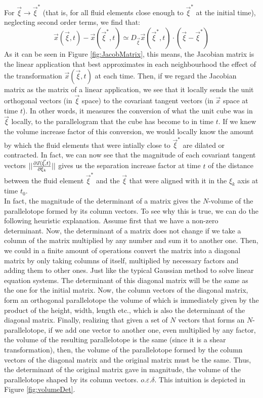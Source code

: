 \documentclass[11pt, a4paper]{article} %
\DeclareRobustCommand{\mybox}[2][gray!20]{%
\begin{tcolorbox}[   %
        left=1cm,
        right=1cm,
        top=0.5cm,
        bottom=0.5cm,
        colback=#1,
        colframe=#1,
        width=\dimexpr\textwidth\relax, 
        enlarge left by=0mm,
        boxsep=5pt,
        arc=0pt,outer arc=0pt,
        ]
        #2
\end{tcolorbox}
}
\begin{document}
\mybox{
For $\vec{\xi}\rightarrow \vec{\xi}^*$ (that is, for all fluid elements close enough to $\vec{\xi}^*$ at the initial time), neglecting second order terms, we find that:
\begin{equation}
\vec{x}(\vec{\xi},t)-\vec{x}(\vec{\xi}^*,t)\simeq D_{\vec{\xi}}\vec{x}(\vec{\xi}^*,t)\cdot (\vec{\xi}-\vec{\xi}^*)
\end{equation}
As it can be seen in Figure \ref{fig:JacobMatrix}, this means, the Jacobian matrix is the linear application that best approximates in each neighbourhood the effect of the transformation $\vec{x}(\vec{\xi},t)$ at each time. Then, if we regard the Jacobian matrix as the matrix of a linear application, we see that it locally sends the unit orthogonal vectors (in $\vec{\xi}$ space) to the covariant tangent vectors (in $\vec{x}$ space at time $t$). In other words, it measures the conversion of what the unit cube was in $\vec{\xi}$ locally, to the parallelogram that the cube has become to in time $t$. If we knew the volume increase factor of this conversion, we would locally know the amount by which the fluid elements that were intially close to $\vec{\xi}^*$ are dilated or contracted. In fact, we can now see that the magnitude of each covariant tangent vectors $||\pdv{\vec{x}(\vec{\xi},t)}{\xi_k}||$ gives us the separation increase factor at time $t$ of the distance between the fluid element $\vec{\xi}^*$ and the $\vec{\xi}$ that were aligned with it in the $\xi_k$ axis at time $t_0$.\\

In fact, the magnitude of the determinant of a matrix gives the $N$-volume of the parallelotope formed by its column vectors. To see why this is true, we can do the following heuristic explanation. Assume first that we have a non-zero determinant. Now, the determinant of a matrix does not change if we take a column of the matrix multiplied by any number and sum it to another one. Then, we could in a finite amount of operations convert the matrix into a diagonal matrix by only taking columns of itself, multiplied by necessary factors and adding them to other ones. Just like the typical Gaussian method to solve linear equation systems. The determinant of this diagonal matrix will be the same as the one for the initial matrix. Now, the column vectors of the diagonal matrix, form an orthogonal parallelotope the volume of which is immediately given by the product of the height, width, length etc., which is also the determinant of the diagonal matrix. Finally, realizing that given a set of $N$ vectors that forms an $N$-parallelotope, if we add one vector to another one, even multiplied by any factor, the volume of the resulting parallelotope is the same (since it is a shear transformation), then, the volume of the parallelotope formed by the column vectors of the diagonal matrix and the original matrix must be the same. Thus, the determinant of the original matrix gave in magnitude, the volume of the parallelotope shaped by its column vectors. $o.\varepsilon.\delta$. This intuition is depicted in Figure \ref{fig:volumeDet}.\\

}
\end{document}
